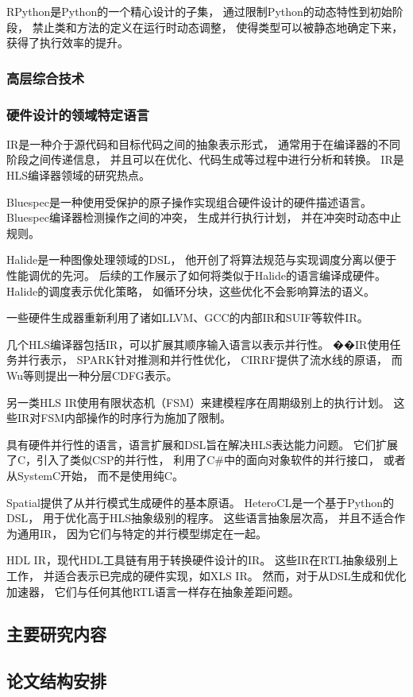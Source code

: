 RPython\cite{rpython}是Python的一个精心设计的子集，
通过限制Python的动态特性到初始阶段，
禁止类和方法的定义在运行时动态调整，
使得类型可以被静态地确定下来，
获得了执行效率的提升。

\subsubsection{高层综合技术}

\subsubsection{硬件设计的领域特定语言}

IR是一种介于源代码和目标代码之间的抽象表示形式，
通常用于在编译器的不同阶段之间传递信息，
并且可以在优化、代码生成等过程中进行分析和转换。
IR是HLS编译器领域的研究热点。

Bluespec是一种使用受保护的原子操作实现组合硬件设计的硬件描述语言。
Bluespec编译器检测操作之间的冲突，
生成并行执行计划，
并在冲突时动态中止规则。

Halide是一种图像处理领域的DSL，
他开创了将算法规范与实现调度分离以便于性能调优的先河。
后续的工作展示了如何将类似于Halide的语言编译成硬件。
Halide的调度表示优化策略，
如循环分块，这些优化不会影响算法的语义。

一些硬件生成器重新利用了诸如LLVM、GCC的内部IR和SUIF等软件IR。

几个HLS编译器包括IR，可以扩展其顺序输入语言以表示并行性。
��IR使用任务并行表示，
SPARK针对推测和并行性优化，
CIRRF提供了流水线的原语，
而Wu等则提出一种分层CDFG表示。

另一类HLS IR使用有限状态机（FSM）来建模程序在周期级别上的执行计划。
这些IR对FSM内部操作的时序行为施加了限制。

具有硬件并行性的语言，语言扩展和DSL旨在解决HLS表达能力问题。
它们扩展了C，引入了类似CSP的并行性，
利用了C\#中的面向对象软件的并行接口，
或者从SystemC开始，
而不是使用纯C。

Spatial提供了从并行模式生成硬件的基本原语。
HeteroCL是一个基于Python的DSL，
用于优化高于HLS抽象级别的程序。
这些语言抽象层次高，
并且不适合作为通用IR，
因为它们与特定的并行模型绑定在一起。

HDL IR，现代HDL工具链有用于转换硬件设计的IR。
这些IR在RTL抽象级别上工作，
并适合表示已完成的硬件实现，如XLS IR。
然而，对于从DSL生成和优化加速器，
它们与任何其他RTL语言一样存在抽象差距问题。

\subsection{主要研究内容}

\subsection{论文结构安排}